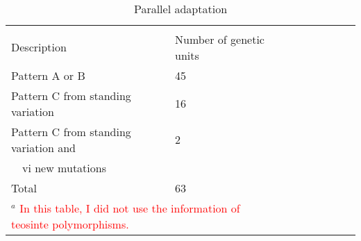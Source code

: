 



\renewcommand{\arraystretch}{1.1}
\begin{table}[tb]

\begin{center}
 \caption[]{Parallel adaptation\hspace*{0.3cm}}
  \textbf{}\\[-2mm]
{\fontsize{7}{11}\sf
    \begin{tabular}{lllcccccl} \hline
       & & \\[-3mm]
     Description  & Number of genetic units\\[0.1cm]
    \hline
Pattern A or B     & 45 \\
Pattern C from standing variation & 16\\ 
Pattern C from standing variation and & 2\\
\ \ vi new mutations & \\
Total & 63\\[1mm]
    \hline
  \multicolumn{2}{l}{$^{a}$ \textcolor{red}{In this table, I did not use the information of teosinte polymorphisms.}}\\
    \end{tabular}
    \label{paraGU}  %
}
\end{center}
\end{table}
\renewcommand{\arraystretch}{1}


